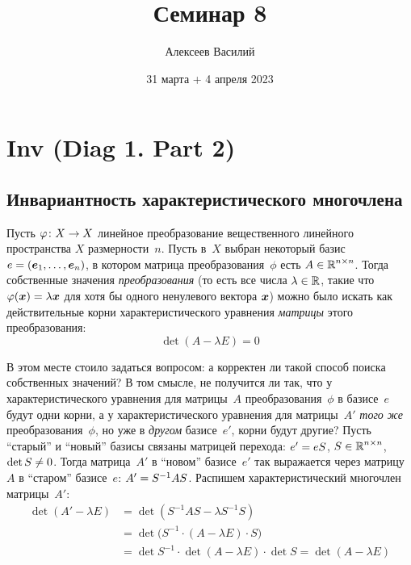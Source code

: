 \documentclass[a4paper,12pt]{article}
\author{Алексеев Василий}
\title{Семинар 8}
\date{31 марта + 4 апреля 2023}
\begin{document}
  \maketitle
  
  \tableofcontents

  \thispagestyle{empty}
  
  \newpage
  


  \section{Inv (Diag 1. Part 2)}
  
  \subsection{Инвариантность характеристического многочлена}
  
  Пусть $\phi\colon X \hm\to X$ линейное преобразование вещественного линейного пространства $X$ размерности~$n$.
  Пусть в~$X$ выбран некоторый базис $e \hm= (\bds e_1, \ldots, \bds e_n)$, в котором матрица преобразования~$\phi$ есть $A \hm\in \RR^{n \times n}$.
  Тогда собственные значения \emph{преобразования} (то есть все числа $\lambda \hm\in \RR$, такие что $\phi(\bds x) \hm= \lambda \bds x$ для хотя бы одного ненулевого вектора $\boldsymbol x$) можно было искать как действительные корни характеристического уравнения \emph{матрицы} этого преобразования:
  \begin{equation}\label{eq:characteristic}
    \det (A - \lambda E) = 0
  \end{equation}
  
  В этом месте стоило задаться вопросом: а корректен ли такой способ поиска собственных значений?
  В том смысле, не получится ли так, что у характеристического уравнения для матрицы~$A$ преобразования~$\phi$ в базисе~$e$ будут одни корни, а у характеристического уравнения для матрицы~$A'$ \emph{того же} преобразования~$\phi$, но уже в \emph{другом} базисе~$e'$, корни будут другие?  %
  Пусть ``старый'' и ``новый'' базисы связаны матрицей перехода: $e' \hm= e S$, $S \hm\in \RR^{n\times n}$, $\det S \hm{\not=} 0$.
  Тогда матрица~$A'$ в ``новом'' базисе~$e'$ так выражается через матрицу~$A$ в ``старом'' базисе~$e$: $A' \hm= S^{-1} A S$.
  Распишем характеристический многочлен матрицы~$A'$:
  \begin{equation*}
  \begin{split}
    \det(A' - \lambda E)
      &= \det(S^{-1} A S - \lambda S^{-1} S)\\
      &= \det\bigl(S^{-1} \cdot (A - \lambda E) \cdot S\bigr)\\
      &= \det S^{-1} \cdot \det(A - \lambda E) \cdot \det S
      = \det(A - \lambda E)
  \end{split}
  \end{equation*}
  
\end{document}
